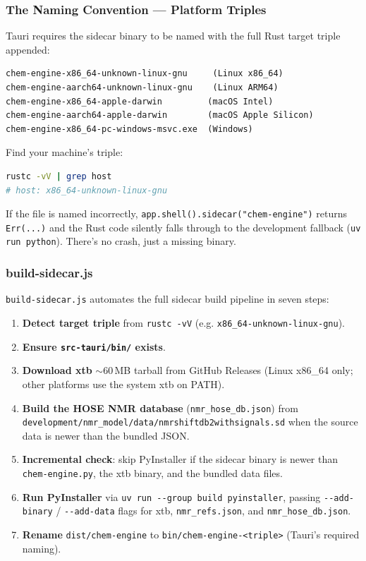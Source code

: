 \documentclass[11pt,a4paper]{article}
\begin{document}
\subsubsection{The Naming Convention --- Platform Triples}

Tauri requires the sidecar binary to be named with the full Rust target triple appended:

\begin{lstlisting}[language={}]
chem-engine-x86_64-unknown-linux-gnu     (Linux x86_64)
chem-engine-aarch64-unknown-linux-gnu    (Linux ARM64)
chem-engine-x86_64-apple-darwin         (macOS Intel)
chem-engine-aarch64-apple-darwin        (macOS Apple Silicon)
chem-engine-x86_64-pc-windows-msvc.exe  (Windows)
\end{lstlisting}

Find your machine's triple:
\begin{lstlisting}[language=bash]
rustc -vV | grep host
# host: x86_64-unknown-linux-gnu
\end{lstlisting}

If the file is named incorrectly, \lstinline|app.shell().sidecar("chem-engine")| returns
\lstinline|Err(...)| and the Rust code silently falls through to the development fallback
(\lstinline|uv run python|). There's no crash, just a missing binary.

\subsubsection{build-sidecar.js}

\lstinline|build-sidecar.js| automates the full sidecar build pipeline in seven steps:

\begin{enumerate}[leftmargin=1.5em]
  \item \textbf{Detect target triple} from \lstinline|rustc -vV| (e.g.
        \lstinline|x86_64-unknown-linux-gnu|).
  \item \textbf{Ensure \texttt{src-tauri/bin/} exists}.
  \item \textbf{Download xtb} $\sim$60\,MB tarball from GitHub Releases (Linux x86\_64
        only; other platforms use the system xtb on PATH).
  \item \textbf{Build the HOSE NMR database} (\lstinline|nmr_hose_db.json|) from
        \lstinline|development/nmr_model/data/nmrshiftdb2withsignals.sd| when the source
        data is newer than the bundled JSON.
  \item \textbf{Incremental check}: skip PyInstaller if the sidecar binary is newer
        than \lstinline|chem-engine.py|, the xtb binary, and the bundled data files.
  \item \textbf{Run PyInstaller} via \lstinline|uv run --group build pyinstaller|, passing
        \lstinline|--add-binary| / \lstinline|--add-data| flags for xtb,
        \lstinline|nmr_refs.json|, and \lstinline|nmr_hose_db.json|.
  \item \textbf{Rename} \lstinline|dist/chem-engine| to
        \lstinline|bin/chem-engine-<triple>| (Tauri's required naming).
\end{enumerate}
\end{document}
